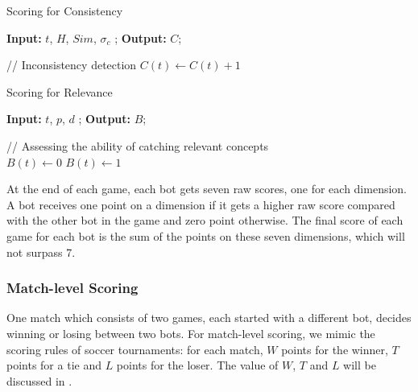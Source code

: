 \begin{algorithm}[th]
\small
\caption{Scoring for Consistency}
\label{algo:inconsist}
\hspace*{0.02in} {\bf Input:}
$t$, $H$, $Sim$, $\sigma_{c}$
; \hspace*{0.02in} {\bf Output:  } 
 $C$;
\begin{algorithmic}[1]
\State // Inconsistency detection
    \State $C(t) \leftarrow C(t) + 1$
   \EndIf
  \EndIf
\end{algorithmic}
\end{algorithm}

\begin{algorithm}[th]
\small
\caption{Scoring for Relevance}
\label{algo:bonus}
\hspace*{0.02in} {\bf Input:}
$t$, $p$, $d$
; \hspace*{0.02in} {\bf Output:  } 
$B$;
\begin{algorithmic}[1]
\State // Assessing the ability of catching relevant concepts\\
$B(t) \leftarrow 0$
   \State $B(t) \leftarrow 1$
  \EndIf
 \EndFor
\end{algorithmic}
\end{algorithm}

At the end of each game, each bot gets seven raw scores, 
one for each dimension.  
A bot receives one point on a dimension if it gets a higher raw score 
compared with the other bot in the game and zero point otherwise. 
The final score
of each game 
for each bot is the sum of the points on these seven dimensions,
which will not surpass 7.

\subsubsection{Match-level Scoring}
One match which consists of two games, each started with a different bot, 
decides winning or losing between two bots.
For match-level scoring, we mimic the scoring rules of soccer tournaments:
 for each match, $W$ points for the winner,  
$T$ points for a tie and 
$L$ points for the loser.
The value of $W$, $T$ and $L$ will be discussed in . 

